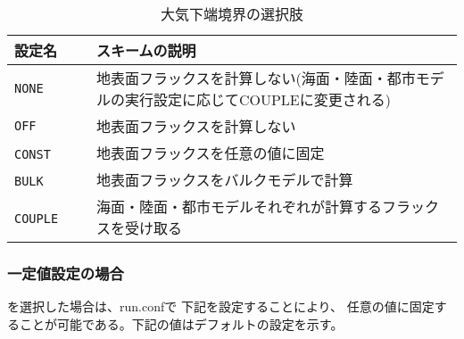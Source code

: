 \begin{table}[h]
\begin{center}
  \caption{大気下端境界の選択肢}
  \label{tab:nml_atm_sf}
  \begin{tabularx}{150mm}{lX} \hline
    \rowcolor[gray]{0.9}  設定名 & スキームの説明\\ \hline
      \verb|NONE|         & 地表面フラックスを計算しない(海面・陸面・都市モデルの実行設定に応じてCOUPLEに変更される) \\
      \verb|OFF|          & 地表面フラックスを計算しない \\
      \verb|CONST|   　　　& 地表面フラックスを任意の値に固定 \\
      \verb|BULK|    　　　& 地表面フラックスをバルクモデルで計算 \\
      \verb|COUPLE|  　　　& 海面・陸面・都市モデルそれぞれが計算するフラックスを受け取る \\
    \hline
  \end{tabularx}
\end{center}
\end{table}

\subsubsection{一定値設定の場合}

を選択した場合は、run.confで
下記を設定することにより、
任意の値に固定することが可能である。下記の値はデフォルトの設定を示す。\\

